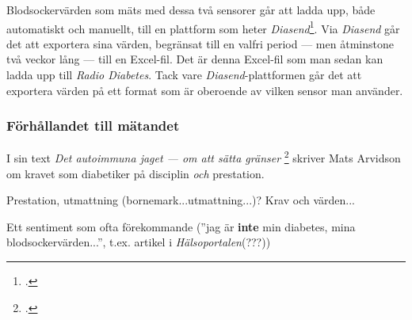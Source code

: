 \documentclass[11pt, a4paper]{article} %
\begin{document}
Blodsockervärden som mäts med dessa två sensorer går att ladda upp, både automatiskt och manuellt, till en plattform som heter \emph{Diasend}\footcite{noauthor_diasendcom_nodate}. Via \emph{Diasend} går det att exportera sina värden, begränsat till en valfri period --- men åtminstone två veckor lång --- till en Excel-fil. Det är denna Excel-fil som man sedan kan ladda upp till \emph{Radio Diabetes}. Tack vare \emph{Diasend}-plattformen går det att exportera värden på ett format som är oberoende av vilken sensor man använder.



\subsubsection*{Förhållandet till mätandet}
I sin text \emph{Det autoimmuna jaget --- om att sätta gränser} \footcite[286]{arvidson_det_2016} skriver Mats Arvidson om kravet som diabetiker på disciplin \emph{och} prestation.

Prestation, utmattning (bornemark...utmattning...)? Krav och värden... 

Ett sentiment som ofta förekommande (''jag är \textbf{inte} min diabetes, mina blodsockervärden...'', t.ex. artikel i \emph{Hälsoportalen}(???))
\end{document}
